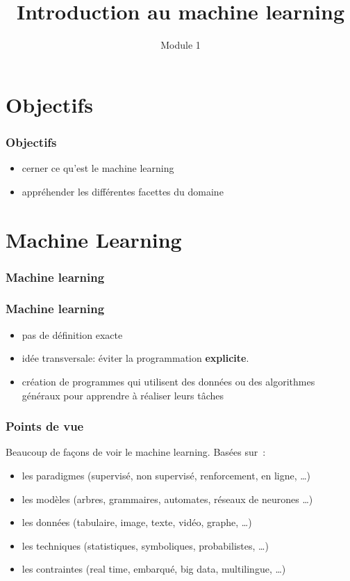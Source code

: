 \documentclass{formation}
\title{Introduction au machine learning}
\subtitle{Module 1}
\begin{document}
\maketitle

\section{Objectifs}

\begin{frame}
  \frametitle{Objectifs}
  \begin{itemize}
  \item cerner ce qu'est le machine learning
  \item appréhender les différentes facettes du domaine
  \end{itemize}
\end{frame}

\section{Machine Learning}

\begin{frame}
  \frametitle{Machine learning}

\end{frame}

\begin{frame}
  \frametitle{Machine learning}
  \begin{itemize}
  \item pas de définition exacte
  \item idée transversale: éviter la programmation \textbf{explicite}.
  \item création de programmes qui utilisent des données ou des
    algorithmes généraux pour apprendre à réaliser leurs tâches
  \end{itemize}
\end{frame}

\begin{frame}
  \frametitle{Points de vue}
  Beaucoup de façons de voir le machine learning. Basées sur :
  \begin{itemize}[<+->]
  \item les paradigmes (supervisé, non supervisé, renforcement, en
    ligne, …)
  \item les modèles (arbres, grammaires, automates, réseaux de
    neurones …)
  \item les données (tabulaire, image, texte, vidéo, graphe, …)
  \item les techniques (statistiques, symboliques, probabilistes, …)
  \item les contraintes (real time, embarqué, big data, multilingue,
    …)
  \end{itemize}

\end{frame}
\end{document}
